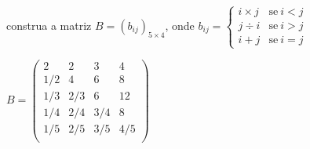 \documentclass[pdftex, brazil, 12pt, oneside, addpoints, answers]{exam}
\begin{document}
\begin{questions}
construa a matriz $B = (b_{ij})_{5 \times 4}$, onde
$b_{ij} =
    \begin{cases}
      i \times j & \text{se}\ i < j\\
      j \div i   & \text{se}\ i > j\\
      i + j      & \text{se}\ i = j
    \end{cases}
$
\begin{solutionorbox}[1.5in]
$B = \begin{pmatrix}
   2    & 2    & 3    &  4\\
   1/2  & 4    & 6    &  8\\
   1/3  & 2/3  & 6    & 12\\
   1/4  & 2/4  & 3/4  &  8\\
   1/5  & 2/5  & 3/5  & 4/5\\
\end{pmatrix}$
\end{solutionorbox}




\end{questions}
\end{document}
